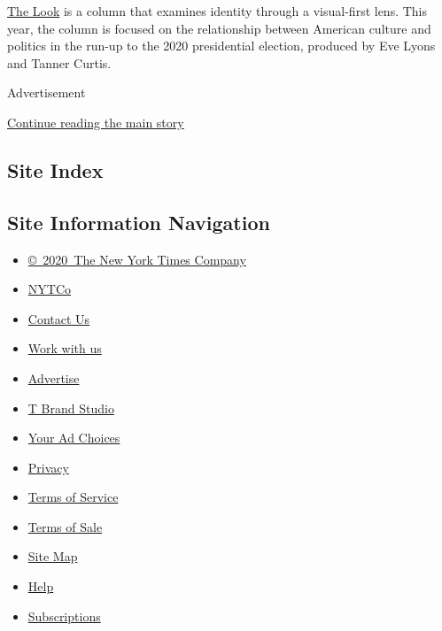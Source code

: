 \href{https://www.nytimes3xbfgragh.onion/column/the-look}{The Look} is a
column that examines identity through a visual-first lens. This year,
the column is focused on the relationship between American culture and
politics in the run-up to the 2020 presidential election, produced by
Eve Lyons and Tanner Curtis.

Advertisement

\protect\hyperlink{after-bottom}{Continue reading the main story}

\hypertarget{site-index}{%
\subsection{Site Index}\label{site-index}}

\hypertarget{site-information-navigation}{%
\subsection{Site Information
Navigation}\label{site-information-navigation}}

\begin{itemize}
\tightlist
\item
  \href{https://help.nytimes3xbfgragh.onion/hc/en-us/articles/115014792127-Copyright-notice}{©~2020~The
  New York Times Company}
\end{itemize}

\begin{itemize}
\tightlist
\item
  \href{https://www.nytco.com/}{NYTCo}
\item
  \href{https://help.nytimes3xbfgragh.onion/hc/en-us/articles/115015385887-Contact-Us}{Contact
  Us}
\item
  \href{https://www.nytco.com/careers/}{Work with us}
\item
  \href{https://nytmediakit.com/}{Advertise}
\item
  \href{http://www.tbrandstudio.com/}{T Brand Studio}
\item
  \href{https://www.nytimes3xbfgragh.onion/privacy/cookie-policy\#how-do-i-manage-trackers}{Your
  Ad Choices}
\item
  \href{https://www.nytimes3xbfgragh.onion/privacy}{Privacy}
\item
  \href{https://help.nytimes3xbfgragh.onion/hc/en-us/articles/115014893428-Terms-of-service}{Terms
  of Service}
\item
  \href{https://help.nytimes3xbfgragh.onion/hc/en-us/articles/115014893968-Terms-of-sale}{Terms
  of Sale}
\item
  \href{https://spiderbites.nytimes3xbfgragh.onion}{Site Map}
\item
  \href{https://help.nytimes3xbfgragh.onion/hc/en-us}{Help}
\item
  \href{https://www.nytimes3xbfgragh.onion/subscription?campaignId=37WXW}{Subscriptions}
\end{itemize}
